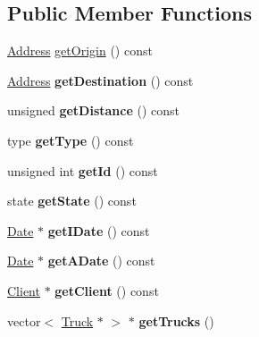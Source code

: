 \subsection*{Public Member Functions}
\begin{DoxyCompactItemize}
\item 
\hyperlink{class_address}{Address} \hyperlink{class_service_a186e0115cc0197181b4e060bfe4cd502}{get\+Origin} () const
\item 
\mbox{\label{class_service_a2aabf308bd77e1de07afa28d5ff72b08}} 
\hyperlink{class_address}{Address} {\bfseries get\+Destination} () const
\item 
\mbox{\label{class_service_a7b36594e1a24656f065f7d41b79bb718}} 
unsigned {\bfseries get\+Distance} () const
\item 
\mbox{\label{class_service_a75f96cd94a42b604ff179343576e1bba}} 
type {\bfseries get\+Type} () const
\item 
\mbox{\label{class_service_a5a19731d4fa91658afe908167fe66ad6}} 
unsigned int {\bfseries get\+Id} () const
\item 
\mbox{\label{class_service_adf7f337e38c8de87e82b42f15c7ccad3}} 
state {\bfseries get\+State} () const
\item 
\mbox{\label{class_service_a3a8b665eff7933227303dc070bb29485}} 
\hyperlink{class_date}{Date} $\ast$ {\bfseries get\+I\+Date} () const
\item 
\mbox{\label{class_service_a2b08c3d53ab2246eb3cca649c2baa100}} 
\hyperlink{class_date}{Date} $\ast$ {\bfseries get\+A\+Date} () const
\item 
\mbox{\label{class_service_a4a9cc0a45f030f69b3d6468df5d02aaa}} 
\hyperlink{class_client}{Client} $\ast$ {\bfseries get\+Client} () const
\item 
\mbox{\label{class_service_a5d4a097657f1cce3b60ab805fbfb0c80}} 
vector$<$ \hyperlink{class_truck}{Truck} $\ast$ $>$ $\ast$ {\bfseries get\+Trucks} ()
\item 
\mbox{\label{class_service_ac5dca2c1b78ff990827554d4ac9c5990}} 

\end{DoxyCompactItemize}
